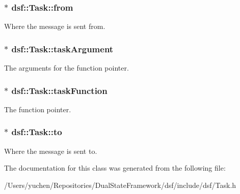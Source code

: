 \subsubsection[{from}]{$\ast$ dsf\+::\+Task\+::from}\label{classdsf_1_1_task_afc1faf30dab0d57501dfdcb4ef7b5450}
Where the message is sent from. \hypertarget{classdsf_1_1_task_a8a095d8a36668f6500d4df8c24dbef8d}{}
\subsubsection[{task\+Argument}]{$\ast$ dsf\+::\+Task\+::task\+Argument}\label{classdsf_1_1_task_a8a095d8a36668f6500d4df8c24dbef8d}
The arguments for the function pointer. \hypertarget{classdsf_1_1_task_a681617cab34fbae641c5b0cf4be46659}{}
\subsubsection[{task\+Function}]{$\ast$ dsf\+::\+Task\+::task\+Function}\label{classdsf_1_1_task_a681617cab34fbae641c5b0cf4be46659}
The function pointer. \hypertarget{classdsf_1_1_task_a36c485fbeb9c2330f5637b9d625cf01a}{}
\subsubsection[{to}]{$\ast$ dsf\+::\+Task\+::to}\label{classdsf_1_1_task_a36c485fbeb9c2330f5637b9d625cf01a}
Where the message is sent to. 

The documentation for this class was generated from the following file\+:\begin{DoxyCompactItemize}
\item 
/\+Users/yuchen/\+Repositories/\+Dual\+State\+Framework/dsf/include/dsf/Task.\+h\end{DoxyCompactItemize}
